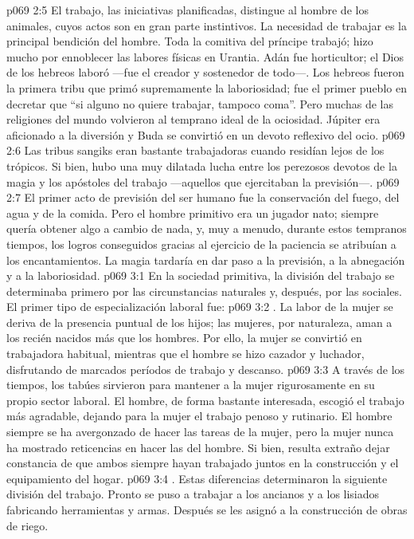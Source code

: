 \vs p069 2:5 El trabajo, las iniciativas planificadas, distingue al hombre de los animales, cuyos actos son en gran parte instintivos. La necesidad de trabajar es la principal bendición del hombre. Toda la comitiva del príncipe trabajó; hizo mucho por ennoblecer las labores físicas en Urantia. Adán fue horticultor; el Dios de los hebreos laboró ---fue el creador y sostenedor de todo---. Los hebreos fueron la primera tribu que primó supremamente la laboriosidad; fue el primer pueblo en decretar que “si alguno no quiere trabajar, tampoco coma”. Pero muchas de las religiones del mundo volvieron al temprano ideal de la ociosidad. Júpiter era aficionado a la diversión y Buda se convirtió en un devoto reflexivo del ocio.
\vs p069 2:6 Las tribus sangiks eran bastante trabajadoras cuando residían lejos de los trópicos. Si bien, hubo una muy dilatada lucha entre los perezosos devotos de la magia y los apóstoles del trabajo ---aquellos que ejercitaban la previsión---.
\vs p069 2:7 El primer acto de previsión del ser humano fue la conservación del fuego, del agua y de la comida. Pero el hombre primitivo era un jugador nato; siempre quería obtener algo a cambio de nada, y, muy a menudo, durante estos tempranos tiempos, los logros conseguidos gracias al ejercicio de la paciencia se atribuían a los encantamientos. La magia tardaría en dar paso a la previsión, a la abnegación y a la laboriosidad.
\vs p069 3:1 En la sociedad primitiva, la división del trabajo se determinaba primero por las circunstancias naturales y, después, por las sociales. El primer tipo de especialización laboral fue:
\vs p069 3:2 . La labor de la mujer se deriva de la presencia puntual de los hijos; las mujeres, por naturaleza, aman a los recién nacidos más que los hombres. Por ello, la mujer se convirtió en trabajadora habitual, mientras que el hombre se hizo cazador y luchador, disfrutando de marcados períodos de trabajo y descanso.
\vs p069 3:3 \pc A través de los tiempos, los tabúes sirvieron para mantener a la mujer rigurosamente en su propio sector laboral. El hombre, de forma bastante interesada, escogió el trabajo más agradable, dejando para la mujer el trabajo penoso y rutinario. El hombre siempre se ha avergonzado de hacer las tareas de la mujer, pero la mujer nunca ha mostrado reticencias en hacer las del hombre. Si bien, resulta extraño dejar constancia de que ambos siempre hayan trabajado juntos en la construcción y el equipamiento del hogar.
\vs p069 3:4 . Estas diferencias determinaron la siguiente división del trabajo. Pronto se puso a trabajar a los ancianos y a los lisiados fabricando herramientas y armas. Después se les asignó a la construcción de obras de riego.
